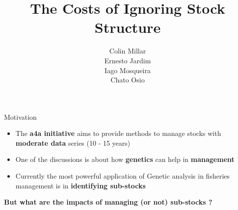 \documentclass{beamer}
\title{The Costs of Ignoring Stock Structure}
\author{Colin Millar\\Ernesto Jardim\\Iago Mosqueira\\Chato Osio}
\institute{European Commission\\ Joint Research Center}
\begin{document}



\begin{frame}
\titlepage
\end{frame}



\begin{withoutheadline}
\begin{frame}{Motivation}
  \begin{itemize}
    \item The \textbf{a4a initiative} aims to provide methods to manage stocks with \textbf{moderate data} series (10 - 15 years)
    \item One of the discussions is about how \textbf{genetics} can help in \textbf{management}
    \item Currently the most powerful application of Genetic analysis in fisheries management is in \textbf{identifying sub-stocks}
  \end{itemize}
\end{frame}
\end{withoutheadline}

\begin{withoutheadline}
\begin{frame}{}
\begin{center}
\LARGE \textbf{But what are the impacts of managing (or not) sub-stocks ?}
\end{center}
\end{frame}
\end{withoutheadline}
\end{document}
